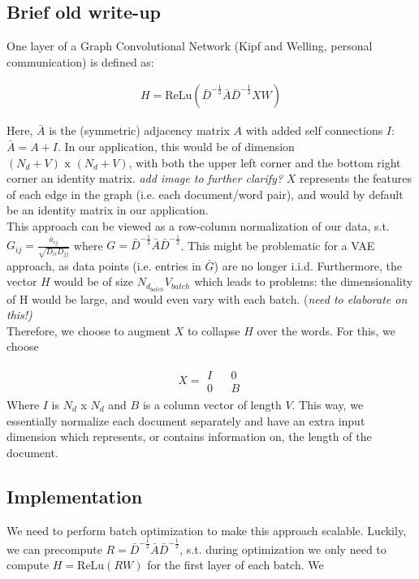 \documentclass{report}
\begin{document}
\subsection{Brief old write-up}
One layer of a Graph Convolutional Network (Kipf and Welling, personal communication) is defined as: 

\begin{align}
H = \text{ReLu}(\bar{D}^{-\frac{1}{2}}\bar{A}\bar{D}^{-\frac{1}{2}}XW)
\end{align}

Here, $\bar{A}$ is the (symmetric) adjacency matrix $A$ with added self connections $I$:$\bar{A} = A+I$. In our application, this would be of dimension $(N_d + V) \text{ x } (N_d + V)$, with both the upper left corner and the bottom right corner an identity matrix. \textit{add image to further clarify?} $X$ represents the features of each edge in the graph (i.e. each document/word pair), and would by default be an identity matrix in our application. \\
This approach can be viewed as a row-column normalization of our data, s.t. $G_{ij} = \frac{\bar{a}_{ij}}{\sqrt{D_{ii}D_{jj}}}$ where $G = \bar{D}^{-\frac{1}{2}}\bar{A}\bar{D}^{-\frac{1}{2}}$. This might be problematic for a VAE approach, as  data points (i.e. entries in $\bar{G}$) are no longer i.i.d. Furthermore, the vector $H$ would be of size $N_{d_{batch}} V_{batch}$ which leads to problems: the dimensionality of H would be large, and would even vary with each batch. (\textit{need to elaborate on this!)} \\
Therefore, we choose to augment $X$ to collapse $H$ over the words. For this, we choose 

\begin{align}
X = 
\begin{matrix} 
I && 0 \\
0 && B
\end{matrix}
\end{align}
Where $I$ is $N_{d}$ x $N_{d}$ and $B$ is a column vector of length $V$. This way, we essentially normalize each document separately and have an extra input dimension which represents, or contains information on, the length of the document. \\


\subsection{Implementation}

We need to perform batch optimization to make this approach scalable. Luckily, we can precompute $R =  \bar{D}^{-\frac{1}{2}}\bar{A}\bar{D}^{-\frac{1}{2}}$, s.t. during optimization we only need to compute $H = \text{ReLu}(RW)$ for the first layer of each batch. We
\end{document}
